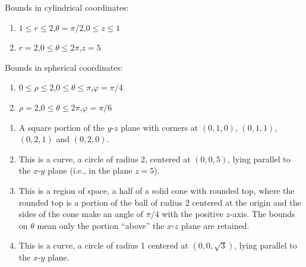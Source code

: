 {Bounds in cylindrical coordinates:
\begin{enumerate}
	\item $1\leq r\leq 2$,\quad $\theta= \pi/2$,\quad $0\leq z\leq 1$

	\item $r= 2$,\quad $0\leq \theta\leq 2\pi$,\quad $z=5$
\end{enumerate}

Bounds in spherical coordinates:

\begin{enumerate}\addtocounter{enumii}{2}
	\item $0\leq\rho\leq2$,\quad $0\leq \theta\leq\pi$,\quad $\varphi = \pi/4$
	
	\item $\rho=2$,\quad $0\leq \theta\leq2\pi$,\quad $\varphi = \pi/6$

\end{enumerate}
\columnbreak
}
{\begin{enumerate}
\item	A square portion of the $y$-$z$ plane with corners at $(0,1,0)$, $(0,1,1)$, $(0,2,1)$ and $(0,2,0)$.

\item	 This is a curve, a circle of radius 2, centered at $(0,0,5)$, lying parallel to the $x$-$y$ plane (i.e., in the plane $z=5$).

\item	This is a region of space, a half of a solid cone with rounded top, where the rounded top is a portion of the ball of radius 2 centered at the origin and the sides of the cone make an angle of $\pi/4$ with the positive $z$-axis. The bounds on $\theta$ mean only the portion ``above'' the $x$-$z$ plane are retained.

\item	This is a curve, a circle of radius 1 centered at $(0,0,\sqrt 3)$, lying parallel to the $x$-$y$ plane.

\end{enumerate}
}
